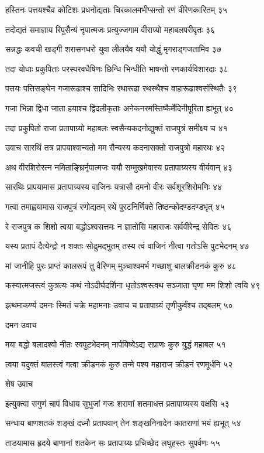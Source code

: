 हस्तिनः पत्तयश्चैव कोटिशः प्रधनोद्यताः
चिरकालमभीप्सन्तो रणं वीरेणकारितम् ३५

तदोद्यतं समाज्ञाय रिपुसैन्यं नृपात्मजः
प्रत्युज्जगाम वीराग्र्यो महाबलपरीवृतः ३६

सन्नद्धः कवची खड्गी शरासनधरो युवा
लीलयैव ययौ योद्धुं मृगराड्गजतामिव ३७

तदा योधाः प्रकुपिताः परस्परवधैषिणः
छिन्धि भिन्धीति भाषन्तो रणकार्यविशारदाः ३८

पत्तयः पत्तिसङ्घेन गजारूढाश्च सादिभिः
रथारूढा रथस्थैश्च वाहारूढाश्वसंस्थितैः ३९

गजा भिन्ना द्विधा जाता हयाश्च द्विदलीकृताः
अनेकनरमस्तिष्कैर्मेदिनीपूरिता ह्यभूत् ४०

तदा प्रकुपितो राजा प्रतापाग्र्यो महाबलः
स्वसैन्यकदनोद्युक्तं राजपुत्रं समीक्ष्य च ४१

उवाच सारथिं तत्र प्रापयाश्वान्यतो मम
सैन्यस्य कदनासक्तो राजपुत्रो महारथः ४२

अथ वीरशिरोरत्न नमिताङ्घ्रिर्नृपात्मजः
ययौ सम्मुखमेवास्य प्रतापाग्र्यस्य वीर्यवान् ४३

सारथिः प्रापयामास प्रतापाग्र्यस्य वाजिनः
यत्रासौ दमनो वीरः सर्वशूरशिरोमणिः ४४

गत्वा तमाह्वयामास राजपुत्रं रणोद्यतम्
रथे पुरटनिर्णिक्ते तिष्ठन्कोदण्डदण्डभृत् ४५

रे राजपुत्र क शिशो त्वया बद्धोऽश्वसत्तमः
न ज्ञातोसि महाराजः सर्ववीरेन्द्र सेवितः ४६

यस्य प्रतापं दैत्येन्द्रो न शक्तः सोढुमद्भुतम्
तस्य त्वं वाजिनं नीत्वा गतोऽसि पुटभेदनम् ४७

मां जानीहि पुरः प्राप्तं कालरूपं तु वैरिणम्
मुञ्चाश्वमर्भ गच्छाशु बालक्रीडनकं कुरु ४८

कस्यात्मजस्त्वं कुत्रत्यः कथं नोऽदीर्घदर्शिना
धृतोऽश्वस्त्वथ सञ्जाता घृणा मम शिशो त्वयि ४९

इत्थमाकर्ण्य दमनः स्मितं चक्रे महामनाः
उवाच च प्रतापाग्र्यं तृणीकुर्वंश्च तद्बलम् ५०

दमन उवाच

मया बद्धो बलादश्वो नीतः स्वपुटभेदनम्
नार्पयिष्येऽद्य सप्राणः कुरु युद्धं महाबल ५१

त्वया यदुक्तं बालस्त्वं गत्वा क्रीडनकं कुरु
तन्मे पश्य महाराज क्रीडनं रणमूर्धनि ५२

शेष उवाच

इत्युक्त्वा सगुणं चापं विधाय सुभुजां गजः
शराणां शतमाधत्त प्रतापाग्र्यस्य वक्षसि ५३

सन्धाय बाणशतकं शङ्खं दध्मौ प्रतापवान्
तेन शङ्खनिनादेन कातराणां भयं ह्यभूत् ५४

ताडयामास हृदये बाणानां शतकेन सः
प्रतापाग्र्यः प्रचिच्छेद लघुहस्तः सुपर्वणः ५५

